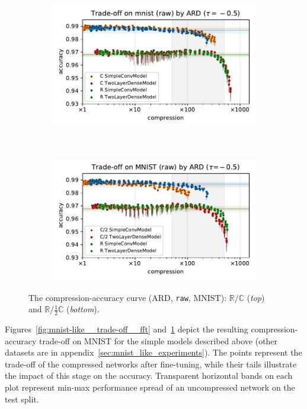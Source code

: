 \documentclass[a4paper,10pt,onecolumn]{article}
\newcommand{\real}{\mathbb{R}}
\newcommand{\cplx}{\mathbb{C}}
\begin{document}
\begin{figure}[!t]
  \centering
  \begin{subfigure}[b]{1.\columnwidth}  %
    \centering
    \includegraphics[width=\columnwidth]{figure__mnist-like__trade-off/appendix__ARD__mnist__raw__-0.5.pdf}
  \end{subfigure} \\%
  \begin{subfigure}[b]{1.\columnwidth}  %
    \centering
    \includegraphics[width=\columnwidth]{figure__mnist-like__trade-off/appendix__cmp__ARD__mnist__raw__-0.5.pdf}
  \end{subfigure}
  \caption{%
    The compression-accuracy curve (ARD, \texttt{raw}, MNIST):
    $\real / \cplx$ (\textit{top}) and $\real / \tfrac12 \cplx$ (\textit{bottom}).
  }
  \label{fig:mnist-like__trade-off__raw}
\end{figure}

Figures~\ref{fig:mnist-like__trade-off__fft} and~\ref{fig:mnist-like__trade-off__raw}
depict the resulting compression-accuracy trade-off on MNIST for the simple models
described above (other datasets are in appendix~\ref{sec:mnist_like_experiments}).
%
The points represent the trade-off of the compressed networks after fine-tuning, while their
tails illustrate the impact of this stage on the accuracy. Transparent horizontal bands on
each plot represent min-max performance spread of an uncompressed network on the test split.
\end{document}
